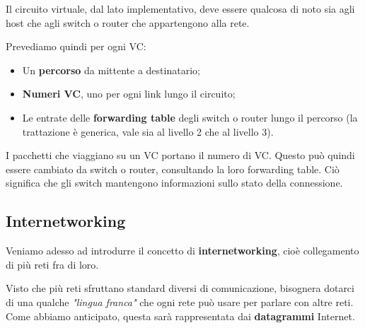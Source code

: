 \documentclass[a4paper,11pt]{article}
\begin{document}
\begin{itemize}
		Il circuito virtuale, dal lato implementativo, deve essere qualcosa di noto sia agli host che agli switch o router che appartengono alla rete.

		Prevediamo quindi per ogni VC:
		\begin{itemize}
			\item Un \textbf{percorso} da mittente a destinatario;
			\item \textbf{Numeri VC}, uno per ogni link lungo il circuito;
			\item Le entrate delle \textbf{forwarding table} degli switch o router lungo il percorso (la trattazione è generica, vale sia al livello 2 che al livello 3).
		\end{itemize}

		I pacchetti che viaggiano su un VC portano il numero di VC. Questo può quindi essere cambiato da switch o router, consultando la loro forwarding table. Ciò significa che gli switch mantengono informazioni sullo stato della connessione. 
\end{itemize}

\subsection{Internetworking}
Veniamo adesso ad introdurre il concetto di \textbf{internetworking}, cioè collegamento di più reti fra di loro.

Visto che più reti sfruttano standard diversi di comunicazione, bisognera dotarci di una qualche \textit{"lingua franca"} che ogni rete può usare per parlare con altre reti. Come abbiamo anticipato, questa sarà rappresentata dai \textbf{datagrammi} Internet.
\end{document}

